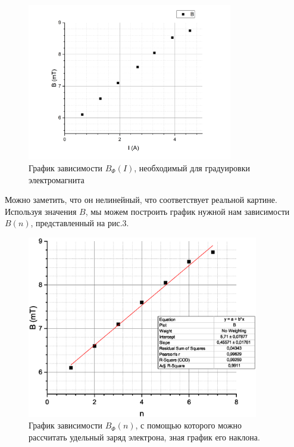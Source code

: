 \documentclass[a4paper, 14pt]{extarticle}%
\newcommand\ECaption[1]{%
     \captionsetup{font=footnotesize}%
     \caption{#1}}
\begin{document}
\begin{figure}[h!]
\begin{center}
\includegraphics[width=0.8\textwidth]{grAI}
\end{center}
\ECaption{График зависимости $B_{\Phi}(I)$, необходимый для градуировки электромагнита}
\end{figure}

Можно заметить, что он нелинейный, что соответствует реальной картине. Используя значения $B$, мы можем построить график нужной нам зависимости $B(n)$, представленный на рис.3.

\begin{figure}[h!]
\begin{center}
\includegraphics[width=0.9\textwidth]{grAn}
\end{center}
\ECaption{График зависимости $B_{\Phi}(n)$, с помощью которого можно рассчитать удельный заряд электрона, зная график его наклона.}
\end{figure}
\end{document}
